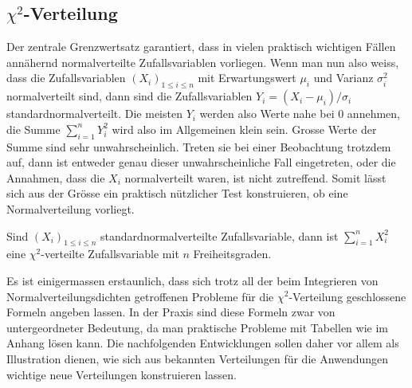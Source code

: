 %
%
%
\subsection{\texorpdfstring{$\chi^2$}{Chi hoch 2}-Verteilung} \label{chi2verteilung}
Der zentrale Grenzwertsatz garantiert, dass in vielen praktisch wichtigen
Fällen annähernd normalverteilte Zufallsvariablen vorliegen.
Wenn man nun also weiss, dass die Zufallsvariablen $(X_i)_{1\le i\le n}$
mit Erwartungswert $\mu_i$ und Varianz $\sigma_i^2$ normalverteilt
sind, dann sind die Zufallsvariablen $Y_i=(X_i-\mu_i)/\sigma_i$
standardnormalverteilt.
Die meisten $Y_i$ werden also Werte nahe
bei $0$ annehmen, die Summe $\sum_{i=1}^nY_i^2$ wird also im
Allgemeinen klein sein.
Grosse Werte der Summe sind sehr unwahrscheinlich.
Treten sie bei einer Beobachtung trotzdem auf, dann ist entweder genau
dieser unwahrscheinliche Fall eingetreten, oder die Annahmen, dass die
$X_i$ normalverteilt waren, ist nicht zutreffend.
Somit lässt sich
aus der Grösse ein praktisch nützlicher Test konstruieren, ob
eine Normalverteilung vorliegt.


\begin{definition}
Sind $(X_i)_{1\le i\le n}$ standardnormalverteilte Zufallsvariable,
dann ist $\sum_{i=1}^nX_i^2$ eine $\chi^2$-verteilte Zufallsvariable
mit $n$ Freiheitsgraden.
\end{definition}

Es ist einigermassen erstaunlich, dass sich trotz all der beim Integrieren
von Normalverteilungsdichten getroffenen Probleme für die $\chi^2$-Verteilung
geschlossene Formeln angeben lassen.
In der Praxis sind diese Formeln zwar von untergeordneter Bedeutung, da
man praktische Probleme mit Tabellen wie im Anhang lösen kann.
Die nachfolgenden Entwicklungen sollen daher vor allem als Illustration
dienen, wie sich aus bekannten Verteilungen für die Anwendungen wichtige
neue Verteilungen konstruieren lassen.

